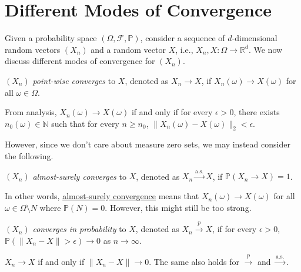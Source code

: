 \section{Different Modes of Convergence}
Given a probability space \((\Omega , \mathscr{F} , \mathbb{P} )\), consider a sequence of \(d\)-dimensional random vectors \((X_n)\) and a random vector \(X\), i.e., \(X_n , X\colon \Omega \to \mathbb{R} ^d\). We now discuss different modes of convergence for \((X_n)\).

\begin{definition}\label{def:point-wise-convergence}
	\((X_n)\) \emph{point-wise converges} to \(X\), denoted as \(X_n \to X\), if \(X_n(\omega ) \to X(\omega )\) for all \(\omega \in \Omega \).
\end{definition}

\begin{prev}
	From analysis, \(X_n(\omega ) \to X(\omega )\) if and only if for every \(\epsilon > 0\), there exists \(n_0(\omega ) \in \mathbb{N} \) such that for every \(n \geq n_0\), \(\lVert X_n(\omega ) - X(\omega ) \rVert _2 < \epsilon \).
\end{prev}

However, since we don't care about measure zero sets, we may instead consider the following.

\begin{definition}\label{def:almost-surely-convergence}
	\((X_n)\) \emph{almost-surely converges} to \(X\), denoted as \(X_n \overset{\text{a.s.}}{\to } X\), if \(\mathbb{P} (X_n \to X) = 1\).
\end{definition}

In other words, \hyperref[def:almost-surely-convergence]{almost-surely convergence} means that \(X_n(\omega ) \to X(\omega )\) for all \(\omega \in \Omega \setminus N\) where \(\mathbb{P} (N) = 0\). However, this might still be too strong.

\begin{definition}\label{def:convergence-in-probability}
	\((X_n)\) \emph{converges in probability} to \(X\), denoted as \(X_n \overset{p}{\to } X\), if for every \(\epsilon > 0\), \(\mathbb{P} (\lVert X_n - X \rVert > \epsilon ) \to 0\) as \(n \to \infty \).
\end{definition}

\begin{remark}
	\(X_n \to X\) if and only if \(\lVert X_n - X \rVert \to 0\). The same also holds for \(\overset{p}{\to } \) and \(\overset{\text{a.s.} }{\to } \).
\end{remark}

